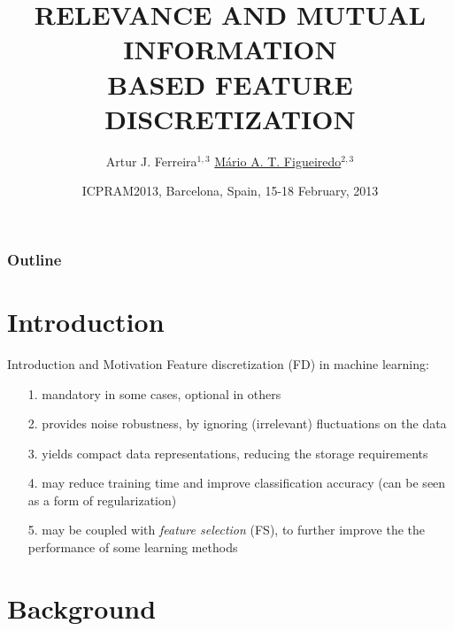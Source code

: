 \documentclass{beamer}
\title{RELEVANCE AND MUTUAL INFORMATION \\ BASED FEATURE DISCRETIZATION}
\author{
	{\large Artur J. Ferreira$^{1,3}$ \qquad \underline{M\'ario A. T. Figueiredo}$^{2,3}$}
}
\institute
{
	\vspace{0.5cm} \\
	{\normalsize $^1$Instituto Superior de Engenharia de Lisboa } \\
	{\normalsize $^2$Instituto Superior T\'{e}cnico} \\
	{\normalsize $^3$Instituto de Telecomunica\c{c}\~{o}es \\ \ \\ Lisboa, PORTUGAL} \\	
}
\date{\footnotesize ICPRAM2013, Barcelona, Spain, 15-18 February, 2013}
\begin{document}
\begin{frame}[t,plain]
\titlepage
\end{frame}

\begin{frame}
\frametitle{Outline}
\tableofcontents
\end{frame}

\section[Introduction]{Introduction}
\begin{frame}{Introduction and Motivation}
Feature discretization (FD) in machine learning:
\begin{itemize}%
	\vfill
	\item[1.] mandatory in some cases, optional in others

	\vfill
	\item[2.]  provides noise robustness, by ignoring 
  (irrelevant) fluctuations on the data

	\vfill
	\item[3.] yields compact data representations, reducing
	the storage requirements

	\vfill
	\item[4.] may reduce training time and improve classification accuracy
(can be seen as a form of regularization)
	
	\vfill
	\item[5.] may be coupled with \emph{feature selection} (FS), to further
     improve the the performance of some learning methods
\end{itemize}
\end{frame}


\section[Background]{Background}
\end{document}
